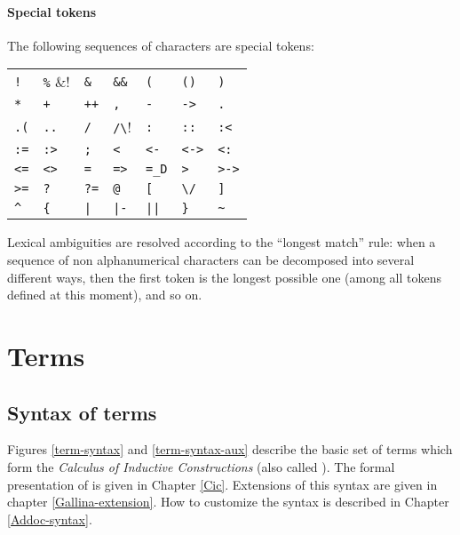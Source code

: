 \paragraph{Special tokens}
The following sequences of characters are special tokens:
\begin{center}
\begin{tabular}{lllllll}
\verb/!/   &
\verb!%!  &
\verb!&!   &
\verb!&&!  &
\verb!(!   &
\verb!()!  &
\verb!)!   \\
%
\verb!*!   &
\verb!+!   &
\verb!++!  &
\verb!,!   &
\verb!-!   &
\verb!->!  &
\verb!.!   \\
%
\verb!.(!  &
\verb!..!  &
\verb!/!   &
\verb!/\!  &
\verb!:!   &
\verb!::!  &
\verb!:<!  \\
%
\verb!:=!  &
\verb!:>!  &
\verb!;!   &
\verb!<!   &
\verb!<-!  &
\verb!<->! &
\verb!<:!  \\
%
\verb!<=!  &
\verb!<>!  &
\verb!=!   &
\verb!=>!  &
\verb!=_D! &
\verb!>!   &
\verb!>->! \\
%
\verb!>=!  &
\verb!?!   &
\verb!?=!  &
\verb!@!   &
\verb![!   &
\verb!\/!  &
\verb!]!   \\
%
\verb!^!   &
\verb!{!   &
\verb!|!   &
\verb!|-!  &
\verb!||!  &
\verb!}!   &
\verb!~!   \\
\end{tabular}
\end{center}

Lexical ambiguities are resolved according to the ``longest match''
rule: when a sequence of non alphanumerical characters can be decomposed
into several different ways, then the first token is the longest
possible one (among all tokens defined at this moment), and so on.

\section{Terms \label{term}}

\subsection{Syntax of terms}

Figures \ref{term-syntax} and \ref{term-syntax-aux} describe the basic
set of terms which form the {\em Calculus of Inductive Constructions}
(also called \CIC). The formal presentation of {\CIC} is given in
Chapter \ref{Cic}. Extensions of this syntax are given in chapter
\ref{Gallina-extension}. How to customize the syntax is described in
Chapter \ref{Addoc-syntax}.

